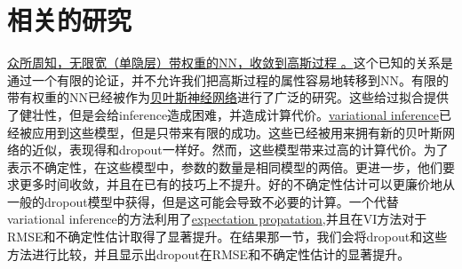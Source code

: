 \documentclass[2pt,a4paper]{article}
\begin{document}
\section{相关的研究}
\underline{众所周知，无限宽（单隐层）带权重的NN，收敛到高斯过程 。}这个已知的关系是通过一个有限的论证，并不允许我们把高斯过程的属性容易地转移到NN。有限的带有权重的NN已经被作为\underline{贝叶斯神经网络}进行了广泛的研究。这些给过拟合提供了健壮性，但是会给inference造成困难，并造成计算代价。\underline{variational inference}已经被应用到这些模型，但是只带来有限的成功。这些已经被用来拥有新的贝叶斯网络的近似，表现得和dropout一样好。然而，这些模型带来过高的计算代价。为了表示不确定性，在这些模型中，参数的数量是相同模型的两倍。更进一步，他们要求更多时间收敛，并且在已有的技巧上不提升。好的不确定性估计可以更廉价地从一般的dropout模型中获得，但是这可能会导致不必要的计算。一个代替variational inference的方法利用了\underline{expectation propatation},并且在VI方法对于RMSE和不确定性估计取得了显著提升。在结果那一节，我们会将dropout和这些方法进行比较，并且显示出dropout在RMSE和不确定性估计的显著提升。
\end{document}
